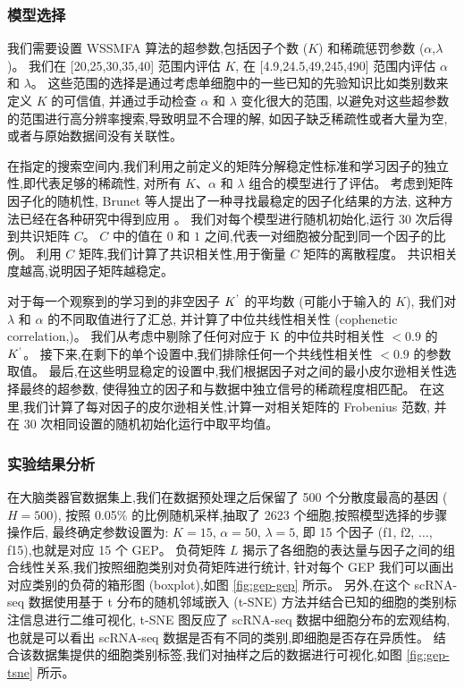 \subsubsection{模型选择}
我们需要设置 WSSMFA 算法的超参数,包括因子个数 ($K$) 和稀疏惩罚参数 ($\alpha$,$\lambda$)。
我们在 [20,25,30,35,40] 范围内评估 $K$, 在 [4.9,24.5,49,245,490] 范围内评估 $\alpha$ 和 $\lambda$。
这些范围的选择是通过考虑单细胞中的一些已知的先验知识比如类别数来定义 $K$ 的可信值,
并通过手动检查 $\alpha$ 和 $\lambda$ 变化很大的范围,
以避免对这些超参数的范围进行高分辨率搜索,导致明显不合理的解,
如因子缺乏稀疏性或者大量为空,或者与原始数据间没有关联性。

在指定的搜索空间内,我们利用之前定义的矩阵分解稳定性标准和学习因子的独立性,即代表足够的稀疏性,
对所有 $K$、$\alpha$ 和 $\lambda$ 组合的模型进行了评估。
考虑到矩阵因子化的随机性, Brunet 等人提出了一种寻找最稳定的因子化结果的方法,
这种方法已经在各种研究中得到应用 \cite{brunet2004metagenes,wu2016stability}。
我们对每个模型进行随机初始化,运行 30 次后得到共识矩阵 $C$。
$C$ 中的值在 $0$ 和 $1$ 之间,代表一对细胞被分配到同一个因子的比例。
利用 $C$ 矩阵,我们计算了共识相关性,用于衡量 $C$ 矩阵的离散程度。
共识相关度越高,说明因子矩阵越稳定。

对于每一个观察到的学习到的非空因子 $K^\textup{'}$ 的平均数 (可能小于输入的 $K$),
我们对 $\lambda$ 和 $\alpha$ 的不同取值进行了汇总,
并计算了中位共线性相关性 (cophenetic correlation,\cite{brunet2004metagenes})。
我们从考虑中剔除了任何对应于 K 的中位共时相关性 $< 0.9$ 的 $K^\textup{'}$。
接下来,在剩下的单个设置中,我们排除任何一个共线性相关性 $< 0.9$ 的参数取值。
最后,在这些明显稳定的设置中,我们根据因子对之间的最小皮尔逊相关性选择最终的超参数,
使得独立的因子和与数据中独立信号的稀疏程度相匹配。
在这里,我们计算了每对因子的皮尔逊相关性,计算一对相关矩阵的 Frobenius 范数, 
并在 30 次相同设置的随机初始化运行中取平均值。

\subsubsection{实验结果分析}

在大脑类器官数据集上,我们在数据预处理之后保留了 500 个分散度最高的基因 ($H = 500$),
按照 0.05\% 的比例随机采样,抽取了 2623 个细胞,按照模型选择的步骤操作后,
最终确定参数设置为: $K = 15$, $\alpha = 50$, $\lambda = 5$, 
即 15 个因子 (f1, f2, $\ldots$, f15),也就是对应 15 个 GEP。
负荷矩阵 $L$ 揭示了各细胞的表达量与因子之间的组合线性关系,我们按照细胞类别对负荷矩阵进行统计,
针对每个 GEP 我们可以画出对应类别的负荷的箱形图 (boxplot),如图 \ref{fig:gep-gep} 所示。
另外,在这个 scRNA-seq 数据使用基于 t 分布的随机邻域嵌入 (t-SNE) 方法并结合已知的细胞的类别标注信息进行二维可视化,
t-SNE 图反应了 scRNA-seq 数据中细胞分布的宏观结构,也就是可以看出 scRNA-seq 数据是否有不同的类别,即细胞是否存在异质性。
结合该数据集提供的细胞类别标签,我们对抽样之后的数据进行可视化,如图 \ref{fig:gep-tsne} 所示。

